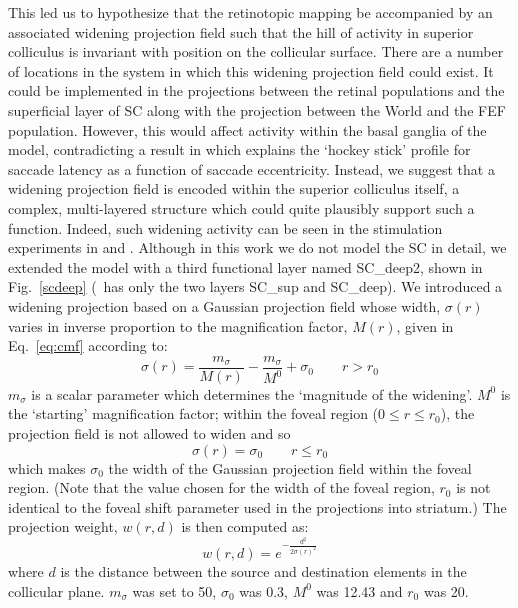 \documentclass{frontiersSCNS}
\begin{document}
This led us to hypothesize that the retinotopic mapping be accompanied
by an associated widening projection field such that the hill of
activity in superior colliculus is invariant with position on the
collicular surface. There are a number of locations in the system in
which this widening projection field could exist. It could be
implemented in the projections between the retinal populations and the
superficial layer of SC along with the projection between the World
and the FEF population. However, this would affect activity within the
basal ganglia of the model, contradicting a result
in \cite{cope_basal_2017} which explains the `hockey stick' profile
for saccade latency as a function of saccade eccentricity. Instead, we
suggest that a widening projection field is encoded within the
superior colliculus itself, a complex, multi-layered structure which
could quite plausibly support such a function. Indeed, such widening
activity can be seen in the stimulation experiments
in \cite{vokoun_intralaminar_2010}
and \cite{vokoun_response_2014}. Although in this work we do not model
the SC in detail, we extended the model with a third functional layer
named SC\_deep2, shown in Fig.~\ref{scdeep} (\ccg~has only the two
layers SC\_sup and SC\_deep). We introduced a widening projection
based on a Gaussian projection field whose width, $\sigma(r)$ varies
in inverse proportion to the magnification factor, $M(r)$, given in
Eq.~\ref{eq:cmf} according to:
\begin{equation} \label{eq:sigmar}
\sigma(r) = \frac{m_{\sigma}}{M(r)} - \frac{m_{\sigma}}{M^0} + \sigma_0 \qquad r > r_0
\end{equation}
$m_{\sigma}$ is a scalar parameter which determines the `magnitude of
the widening'. $M^0$ is the `starting' magnification factor; within
the foveal region ($0 \leq r \leq r_0$), the projection field is not
allowed to widen and so
\begin{equation} \label{eq:sigmar2}
\sigma(r) = \sigma_0 \qquad r \leq r_0
\end{equation}
which makes $\sigma_0$ the width of the Gaussian projection field
within the foveal region. (Note that the value chosen for the width of
the foveal region, $r_0$ is not identical to the foveal shift
parameter used in the  projections into striatum.)
The  projection weight, $w(r,d)$ is then computed
as:
\begin{equation} \label{eq:widening}
w(r,d) = e^{-\frac{d^2}{2\sigma\left(r\right)^2}}
\end{equation}
where $d$ is the distance between the source and destination elements
in the collicular plane.  $m_\sigma$ was set to 50, $\sigma_0$ was
0.3, $M^0$ was 12.43 and $r_0$ was 20.
\end{document}
